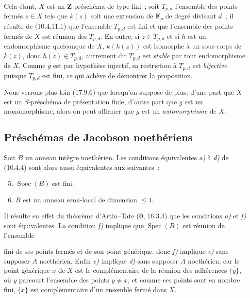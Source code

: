 Cela étant, $X$ est un $\mathbf Z$-préschéma de type fini~; soit $T_{p,d}$
l'ensemble des points fermés $z\in X$ tels que $k(z)$ soit une extension de
$\mathbf F_p$ de degré divisant $d$~; il résulte de (10.4.11.1) que l'ensemble
$T_{p,d}$ est fini et que l'ensemble des points fermés de $X$ est réunion des
$T_{p,d}$. En outre, si $z\in T_{p,d}$ et si $h$ est un endomorphisme
quelconque de $X$, $k(h(z))$ est isomorphe à un sous-corps de $k(z)$, donc
$h(z)\in T_{p,d}$, autrement dit $T_{p,d}$ est \emph{stable} par tout
endomorphisme de $X$. Comme $g$ est par hypothèse injectif, sa restriction à
$T_{p,d}$ est \emph{bijective} puisque $T_{p,d}$ est fini, ce qui achève de
démontrer la proposition.

Nous verrons plus loin (17.9.6) que lorsqu'on suppose de plus, d'une part que
$X$ est un $S$-préschéma de présentation finie, d'autre part que $g$ est un
monomorphisme, alors on peut affirmer que $g$ est un \emph{automorphisme} de
$X$.

\subsection{Préschémas de Jacobson noethériens}
\label{subsection:IV.10.5-fr}

\begin{proposition}[10.5.1]
\label{IV.10.5.1-fr}
Soit $B$ un anneau intègre noethérien. Les conditions équivalentes \emph{a)} à
\emph{d)} de (10.4.4) sont alors aussi équivalentes aux suivantes~:
\begin{enumerate}[label=\emph{\alph*)}]
  \setcounter{enumi}{4}
  \item $\operatorname{Spec}(B)$ est fini.
  \item $B$ est un anneau semi-local de dimension $\leq1$.
\end{enumerate}
\end{proposition}

Il résulte en effet du théorème d'Artin--Tate ($\mathbf 0$, 16.3.3) que les
conditions \emph{a)} et \emph{f)} sont équivalentes. La condition \emph{f)}
implique que $\operatorname{Spec}(B)$ est réunion de l'ensemble

fini de ses points fermés et de son point générique, donc \emph{f)} implique
\emph{e)} sans supposer $A$ noethérien. Enfin \emph{e)} implique \emph{d)} sans
supposer $A$ noethérien, car le point générique $x$ de $X$ est le complémentaire
de la réunion des adhérences $\overline{\{y\}}$, où $y$ parcourt l'ensemble des
points $y\neq x$, et comme ces points sont en nombre fini, $\{x\}$ est
complémentaire d'un ensemble fermé dans $X$.

